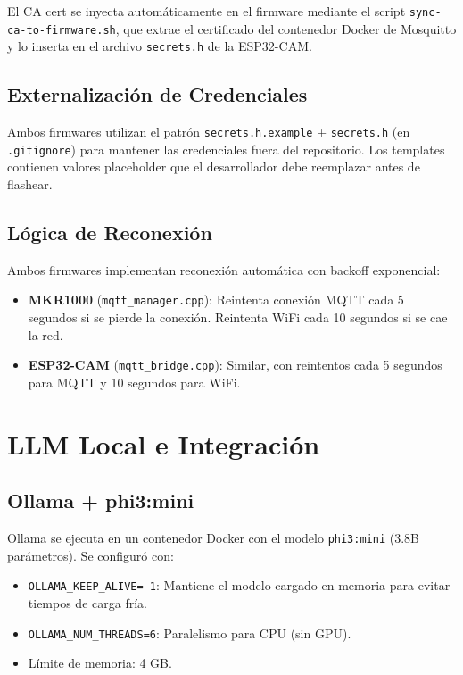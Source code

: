 \documentclass[12pt,letterpaper]{article}
\begin{document}
El CA cert se inyecta automáticamente en el firmware mediante el script \mbox{\texttt{sync-ca-to-firmware.sh}}, que extrae el certificado del contenedor Docker de Mosquitto y lo inserta en el archivo \mbox{\texttt{secrets.h}} de la ESP32-CAM.

\subsection{Externalización de Credenciales}

Ambos firmwares utilizan el patrón \mbox{\texttt{secrets.h.example}} + \mbox{\texttt{secrets.h}} (en \mbox{\texttt{.gitignore}}) para mantener las credenciales fuera del repositorio. Los templates contienen valores placeholder que el desarrollador debe reemplazar antes de flashear.

\subsection{Lógica de Reconexión}

Ambos firmwares implementan reconexión automática con backoff exponencial:

\begin{itemize}
    \item \textbf{MKR1000} (\mbox{\texttt{mqtt\_manager.cpp}}): Reintenta conexión MQTT cada 5 segundos si se pierde la conexión. Reintenta WiFi cada 10 segundos si se cae la red.
    \item \textbf{ESP32-CAM} (\mbox{\texttt{mqtt\_bridge.cpp}}): Similar, con reintentos cada 5 segundos para MQTT y 10 segundos para WiFi.
\end{itemize}

\newpage

\section{LLM Local e Integración}

\subsection{Ollama + phi3:mini}

Ollama se ejecuta en un contenedor Docker con el modelo \mbox{\texttt{phi3:mini}} (3.8B parámetros). Se configuró con:

\begin{itemize}
    \item \mbox{\texttt{OLLAMA\_KEEP\_ALIVE=-1}}: Mantiene el modelo cargado en memoria para evitar tiempos de carga fría.
    \item \mbox{\texttt{OLLAMA\_NUM\_THREADS=6}}: Paralelismo para CPU (sin GPU).
    \item Límite de memoria: 4 GB.
\end{itemize}
\end{document}
